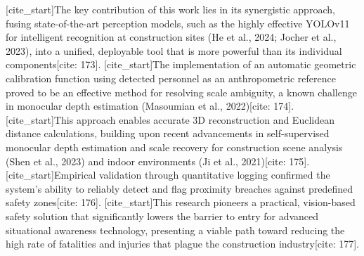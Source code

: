[cite_start]The key contribution of this work lies in its synergistic approach, fusing state-of-the-art perception models, such as the highly effective YOLOv11 for intelligent recognition at construction sites (He et al., 2024; Jocher et al., 2023), into a unified, deployable tool that is more powerful than its individual components[cite: 173]. [cite_start]The implementation of an automatic geometric calibration function using detected personnel as an anthropometric reference proved to be an effective method for resolving scale ambiguity, a known challenge in monocular depth estimation (Masoumian et al., 2022)[cite: 174]. [cite_start]This approach enables accurate 3D reconstruction and Euclidean distance calculations, building upon recent advancements in self-supervised monocular depth estimation and scale recovery for construction scene analysis (Shen et al., 2023) and indoor environments (Ji et al., 2021)[cite: 175]. [cite_start]Empirical validation through quantitative logging confirmed the system's ability to reliably detect and flag proximity breaches against predefined safety zones[cite: 176]. [cite_start]This research pioneers a practical, vision-based safety solution that significantly lowers the barrier to entry for advanced situational awareness technology, presenting a viable path toward reducing the high rate of fatalities and injuries that plague the construction industry[cite: 177].

